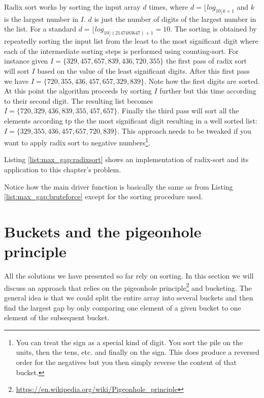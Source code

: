 Radix sort works by sorting the input array $d$ times, where $d = \lfloor log_{10 \rfloor k+1}$ and $k$ is
the largest number in $I$. $d$ is just the number of digits of the largest number in the list. For a
standard  $d=\lfloor log_{10 \rfloor(2147483647) + 1}=10$. The sorting is obtained by repeatedly
sorting the input list from the least to the most significant digit where each of the intermediate
sorting steps is performed using counting-sort. For instance given $I =
\{329,457,657,839,436,720,355\}$ the first pass of radix sort will sort $I$ based on the value of
the least significant digits. After this first pass we have $I=\{720,355,436,457,657,329,839\}$.
Note how the first digits are sorted. At this point the algorithm proceeds by sorting $I$ further
but this time according to their second digit. The resulting list becomes
$I=\{720,329,436,839,355,457,657\}$. Finally the third pass will sort all the elements according tp the
the most significant digit resulting in a well sorted list: $I=\{329,355,436,457,657,720,839\}$.
This approach needs to be tweaked if you want to apply radix sort to negative
numbers\footnote{You can treat the sign as a special kind of digit. You sort the pile on the units,
then the tens, etc. and finally on the sign. This does produce a reversed order for the negatives but
you then simply reverse the content of that bucket.}.

Listing \ref{list:max_gap:radixsort} shows an implementation of radix-sort and its application to
 this chapter's problem.

Notice how the main driver function  is basically the same as
 from Listing \ref{list:max_gap:bruteforce} except for the sorting
procedure used.

\section{Buckets and the pigeonhole principle}
\label{max_gap:sec:buckets}
All the solutions we have presented so far rely on sorting. In this section we will discuss
an approach that relies on  the pigeonhole
principle\footnote{\url{https://en.wikipedia.org/wiki/Pigeonhole_principle}} and bucketing. The
general idea is that we could split the entire array into several buckets and then find the largest
gap by only comparing one element of a given bucket to one element of the subsequent bucket. 

